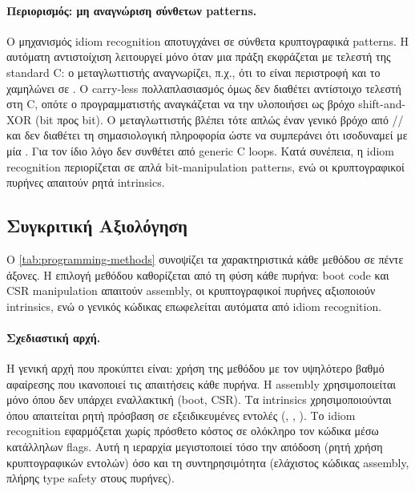 \paragraph{Περιορισμός: μη αναγνώριση σύνθετων patterns.}
Ο μηχανισμός idiom recognition αποτυγχάνει σε σύνθετα κρυπτογραφικά patterns. Η
αυτόματη αντιστοίχιση λειτουργεί μόνο όταν μια πράξη εκφράζεται με τελεστή
της standard C: ο μεταγλωττιστής αναγνωρίζει, π.χ., ότι το
 είναι περιστροφή και το χαμηλώνει σε \rori. Ο
carry-less πολλαπλασιασμός όμως δεν διαθέτει αντίστοιχο τελεστή στη C, οπότε
ο προγραμματιστής αναγκάζεται να την υλοποιήσει ως βρόχο shift-and-XOR (bit
προς bit). Ο μεταγλωττιστής βλέπει τότε απλώς έναν γενικό βρόχο από
// και δεν διαθέτει τη σημασιολογική
πληροφορία ώστε να συμπεράνει ότι ισοδυναμεί με μία \clmul. Για τον ίδιο
λόγο δεν συνθέτει \vclmul από generic C loops. Κατά συνέπεια, η idiom recognition
περιορίζεται σε απλά bit-manipulation patterns, ενώ οι κρυπτογραφικοί
πυρήνες απαιτούν ρητά intrinsics.

\subsection{Συγκριτική Αξιολόγηση}
\label{ssec:methods-comparison}

Ο \cref{tab:programming-methods} συνοψίζει τα χαρακτηριστικά κάθε μεθόδου
σε πέντε άξονες. Η επιλογή μεθόδου καθορίζεται από τη φύση κάθε πυρήνα:
boot code και CSR manipulation απαιτούν assembly, οι κρυπτογραφικοί πυρήνες
αξιοποιούν intrinsics, ενώ ο γενικός κώδικας επωφελείται αυτόματα από
idiom recognition.

\begin{table}[htbp]
  \centering
  \caption{Συγκριτική αξιολόγηση των τεσσάρων μεθόδων προγραμματισμού
    RISC-V.}
  \label{tab:programming-methods}
  \small
  
\end{table}

\paragraph{Σχεδιαστική αρχή.}
Η γενική αρχή που προκύπτει είναι: χρήση της μεθόδου με τον υψηλότερο
βαθμό αφαίρεσης που ικανοποιεί τις απαιτήσεις κάθε πυρήνα. Η assembly
χρησιμοποιείται μόνο όπου δεν υπάρχει εναλλακτική (boot, CSR). Τα
intrinsics χρησιμοποιούνται όπου απαιτείται ρητή πρόσβαση σε
εξειδικευμένες εντολές (\clmul, \vclmul, \vror). Το idiom recognition εφαρμόζεται χωρίς πρόσθετο κόστος σε ολόκληρο τον
κώδικα μέσω κατάλληλων  flags. Αυτή η ιεραρχία μεγιστοποιεί τόσο την απόδοση
(ρητή χρήση κρυπτογραφικών εντολών) όσο και τη συντηρησιμότητα (ελάχιστος
κώδικας assembly, πλήρης type safety στους πυρήνες).

